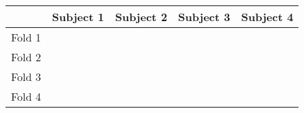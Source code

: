 \begin{tabular}{lcccc}
    \toprule
           & Subject 1 & Subject 2 & Subject 3 & Subject 4 \\
    \midrule
    Fold 1 & \cellcolor{test}     & \multicolumn{3}{c}{\cellcolor{train}} \\
    Fold 2 & \cellcolor{train} & \cellcolor{test}     & \multicolumn{2}{c}{\cellcolor{train}     } \\
    Fold 3 & \multicolumn{2}{c}{\cellcolor{train}     } & \cellcolor{test}     & \cellcolor{train} \\
    Fold 4 & \multicolumn{3}{c}{\cellcolor{train}} & \cellcolor{test}     \\
    \bottomrule
\end{tabular}
